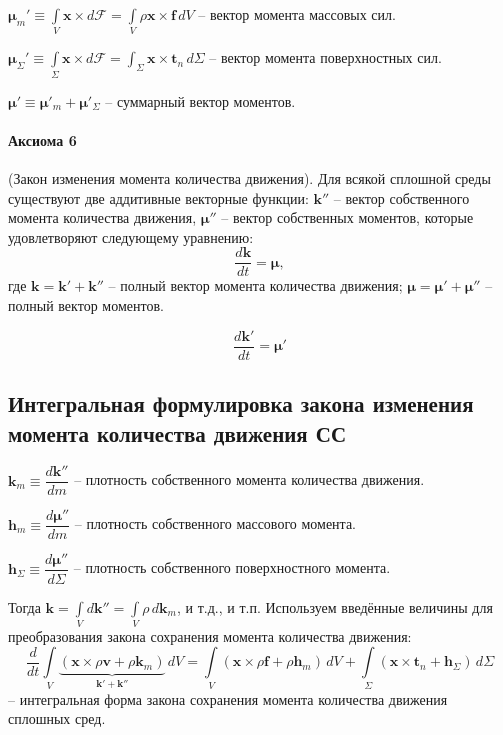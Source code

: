 \begin{definition}
  $\mathbf{\mu}_m' \equiv \int\limits_V \mathbf{x} \times d\mathbf{\mathcal{F}}
  = \int\limits_V \rho \mathbf{x} \times \mathbf{f} \, dV$
  -- вектор момента массовых сил.

  $\mathbf{\mu}_\Sigma' \equiv \int\limits_\Sigma \mathbf{x} \times d\mathbf{\mathcal{F}}
  = \int_\Sigma \mathbf{x} \times \mathbf{t}_n \, d\Sigma$ 
  -- вектор момента поверхностных сил.

  $\mathbf{\mu}' \equiv \mathbf{\mu}'_m + \mathbf{\mu}'_\Sigma$
  -- суммарный вектор моментов.
\end{definition}

\paragraph{Аксиома 6} (Закон изменения момента количества движения).
Для всякой сплошной среды существуют две аддитивные векторные функции:
  $\mathbf{k}''$ -- вектор собственного момента количества движения,
  $\mathbf{\mu}''$ -- вектор собственных моментов,
которые удовлетворяют следующему уравнению:
\[
  \dfrac{d\mathbf{k}}{dt} = \mathbf{\mu},
\]
где $\mathbf{k} = \mathbf{k}' + \mathbf{k}''$ -- полный вектор момента количества движения;
$\mathbf{\mu} = \mathbf{\mu}' + \mathbf{\mu}''$ -- полный вектор моментов.

\[
  \dfrac{d\mathbf{k}'}{dt} = \mathbf{\mu}'
\]


\subsection{Интегральная формулировка закона изменения момента количества движения СС}



\begin{definition}
  $\mathbf{k}_m \equiv \dfrac{d\mathbf{k}''}{dm}$ -- плотность собственного момента количества движения.

  $\mathbf{h}_m \equiv \dfrac{d \mathbf{\mu}''}{dm}$ -- плотность собственного массового момента.
  
  $\mathbf{h}_\Sigma \equiv \dfrac{d \mathbf{\mu}''}{d\Sigma}$ -- плотность собственного поверхностного момента.
\end{definition}

Тогда $\mathbf{k} = \int\limits_V d\mathbf{k}'' = \int\limits_V \rho \, d\mathbf{k}_m$,
и т.д., и т.п.
Используем введённые величины для преобразования закона сохранения момента количества движения:
\[
  \dfrac{d}{dt}\int\limits_V \underbrace{\left( \mathbf{x}\times\rho\mathbf{v}+\rho\mathbf{k}_m \right)}_{\mathbf{k}' + \mathbf{k}''} \, dV
  = \int\limits_V \left( \mathbf{x}\times\rho\mathbf{f}+\rho\mathbf{h}_m \right) \, dV
  + \int\limits_\Sigma \left( \mathbf{x}\times\mathbf{t}_n + \mathbf{h}_\Sigma \right) \, d\Sigma
\]
-- интегральная форма закона сохранения момента количества движения сплошных сред.


